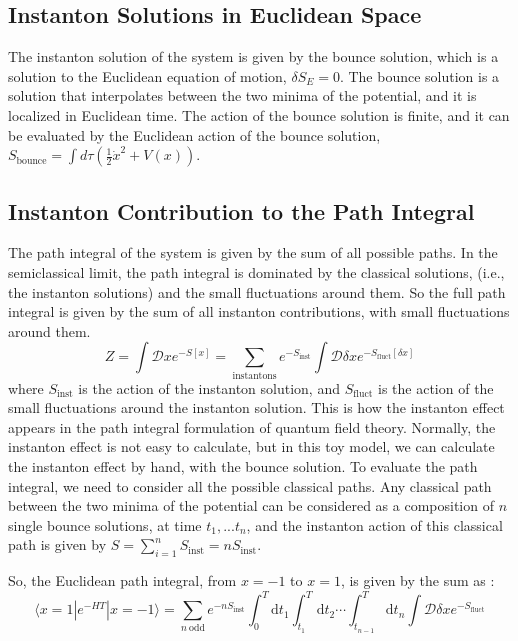 \documentclass{article}
\begin{document}
\subsection{Instanton Solutions in Euclidean Space}


The instanton solution of the system is given by the bounce solution, which is a solution to the Euclidean equation of motion, $\delta S_E = 0$.
The bounce solution is a solution that interpolates between the two minima of the potential, and it is localized in Euclidean time.
The action of the bounce solution is finite, and it can be evaluated by the Euclidean action of the bounce solution, $S_{\text{bounce}} = \int d\tau \left( \frac{1}{2} \dot{x}^2 + V(x) \right)$.




\subsection{Instanton Contribution to the Path Integral}

The path integral of the system is given by the sum of all possible paths. In the semiclassical limit, the path integral is dominated by the classical solutions, (i.e., the instanton solutions) and the small fluctuations around them.
So the full path integral is given by the sum of all instanton contributions, with small fluctuations around them.
\begin{equation}
    Z = \int \mathcal{D}x e^{-S[x]} = \sum_{\text{instantons}} e^{-S_{\text{inst}}} \int \mathcal{D}\delta x e^{-S_{\text{fluct}}[\delta x]}
\end{equation}
where $S_{\text{inst}}$ is the action of the instanton solution, and $S_{\text{fluct}}$ is the action of the small fluctuations around the instanton solution.
This is how the instanton effect appears in the path integral formulation of quantum field theory. Normally, the instanton effect is not easy to calculate, but in this toy model, we can calculate the instanton effect by hand, with the bounce solution.
To evaluate the path integral, we need to consider all the possible classical paths.
Any classical path between the two minima of the potential can be considered as a composition of $n$ single bounce solutions, at time $t_1, ... t_n$, and the instanton action of this classical path is given by $S = \sum_{i=1}^n S_{\text{inst}}=nS_{\text{inst}}$.

So, the Euclidean path integral, from $x = -1$ to $x = 1$, is given by the sum as :
\begin{equation}
    \langle x = 1 | e^{-HT} | x = -1 \rangle = \sum_{n \ \text{odd}} e^{-nS_{\text{inst}}} \int_{0}^T \text{d}t_1 \int_{t_1}^T \text{d}t_2 \cdots \int_{t_{n-1}}^T \text{d}t_n \int \mathcal{D}\delta x e^{-S_{\text{fluct}}}
\end{equation}
\end{document}
